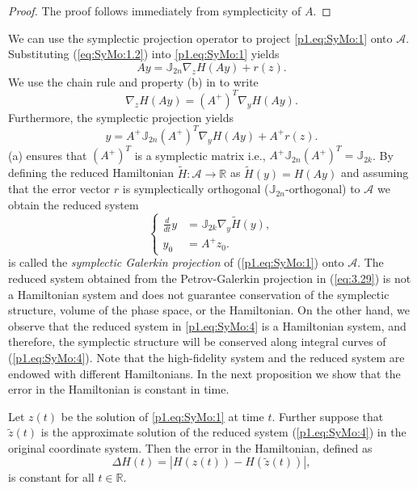 \begin{proof}
The proof follows immediately from symplecticity of $A$.
\end{proof}
We can use the symplectic projection operator to project \eqref{p1.eq:SyMo:1} onto $\mathcal A$. Substituting (\ref{eq:SyMo:1.2}) into \eqref{p1.eq:SyMo:1} yields
\begin{equation} \label{p1.eq:SyMo:2}
	A y = \mathbb{J}_{2n} \nabla_{z} H(A y) + r(z). 
\end{equation}
We use the chain rule and property (b) in  to write 
\begin{equation}
	\nabla_{z} H(A y) = (A^+)^T \nabla_{y} H( Ay ).
\end{equation}
Furthermore, the symplectic projection yields
\begin{equation} \label{p1.eq:SyMo:3}
	y = A^+ \mathbb J_{2n} (A^+)^T \nabla_{y} H(A y) + A^+ r(z).
\end{equation}
 (a) ensures that $(A^+)^T$ is a symplectic matrix i.e., $A^+ \mathbb J_{2n} (A^+)^T = \mathbb{J}_{2k}$. By defining the reduced Hamiltonian $\tilde H:\mathcal A \to \mathbb R$ as $\tilde H (y) = H(Ay)$ and assuming that the error vector $r$ is symplectically orthogonal ($\mathbb J_{2n}$-orthogonal) to $\mathcal A$ we obtain the reduced system
\begin{equation} \label{p1.eq:SyMo:4}
\left\{
\begin{aligned}
	 \frac{d}{dt} y &= \mathbb J_{2k} \nabla_{y} \tilde H(y), \\
	 y_0 &= A^+ z_0.
\end{aligned}
\right.
\end{equation}
 is called the \emph{symplectic Galerkin projection} of (\ref{p1.eq:SyMo:1}) onto $\mathcal A$. The reduced system obtained from the Petrov-Galerkin projection in (\ref{eq:3.29}) is not a Hamiltonian system and does not guarantee conservation of the symplectic structure, volume of the phase space, or the Hamiltonian. On the other hand, we observe that the reduced system in \eqref{p1.eq:SyMo:4} is a Hamiltonian system, and therefore, the symplectic structure will be conserved along integral curves of (\ref{p1.eq:SyMo:4}). Note that the high-fidelity system and the reduced system are endowed with different Hamiltonians. In the next proposition we show that the error in the Hamiltonian is constant in time. 


\begin{proposition} \label{p1.theorem:2}
Let ${z} (t)$ be the solution of \eqref{p1.eq:SyMo:1} at time $t$. Further suppose that $\tilde{{z}} (t)$ is the approximate solution of the reduced system (\ref{p1.eq:SyMo:4}) in the original coordinate system. Then the error in the Hamiltonian, defined as
\begin{equation} \label{p1.eq:SyMo:5}
	\Delta H(t)  = |H(z(t)) - H(\tilde{z}(t))|,
\end{equation}
is constant for all $t\in \mathbb R$.
\end{proposition}

